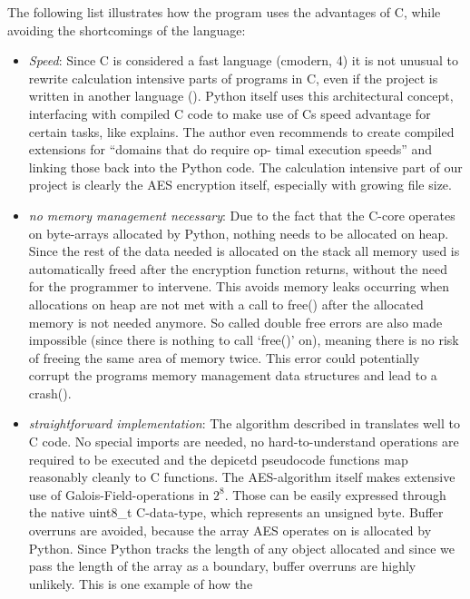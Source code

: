 The following list illustrates how the program uses the advantages of C,
while avoiding the shortcomings of the language:

\begin{itemize}

\item
  \emph{Speed}: Since C is considered a fast language (cmodern, 4) it is
  not unusual to rewrite calculation intensive parts of programs in C,
  even if the project is written in another language
  (\cite[min. 24:33]{speedup}). Python itself
  uses this architectural concept, interfacing with compiled C code to
  make use of Cs speed advantage for certain tasks, like \cite[p. 7]{learningpython} explains. The author even recommends to create compiled extensions
  for ``domains that do require op- timal execution speeds'' and linking
  those back into the Python code. The calculation intensive part of our
  project is clearly the AES encryption itself, especially with growing
  file size.
\item
  \emph{no memory management necessary}: Due to the fact that the C-core
  operates on byte-arrays allocated by Python, nothing needs to be
  allocated on heap. Since the rest of the data needed is allocated on
  the stack all memory used is automatically freed after the encryption
  function returns, without the need for the programmer to intervene.
  This avoids memory leaks occurring when allocations on heap are not
  met with a call to free() after the allocated memory is not needed
  anymore. So called double free errors are also made impossible (since
  there is nothing to call `free()' on), meaning there is no risk of
  freeing the same area of memory twice. This error could potentially
  corrupt the programs memory management data structures and lead to a
  crash(\cite[p. 49]{cpointers}).
\item
  \emph{straightforward implementation}: The algorithm described in
  \cite{fips197} translates well to C code. No special imports are needed, no
  hard-to-understand operations are required to be executed and the
  depicetd pseudocode functions map reasonably cleanly to C functions.
  The AES-algorithm itself makes extensive use of
  Galois-Field-operations in $2^8$. Those can be easily expressed
  through the native uint8\_t C-data-type, which represents an unsigned
  byte. Buffer overruns are avoided, because the array AES operates on
  is allocated by Python. Since Python tracks the length of any object
  allocated and since we pass the length of the array as a boundary,
  buffer overruns are highly unlikely. This is one example of how the

\end{itemize}
